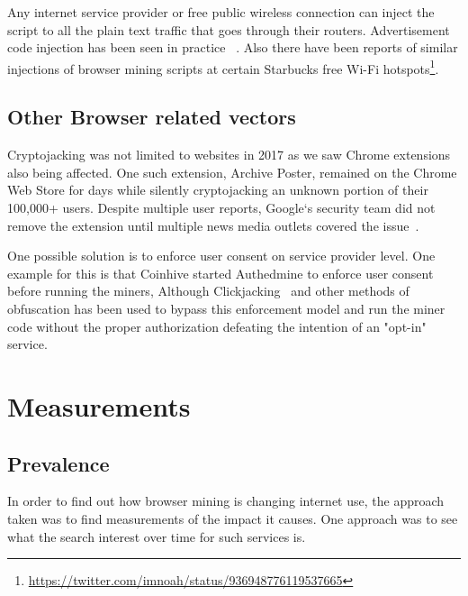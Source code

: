 Any internet service provider or free public wireless connection can inject the script to all the plain text traffic that goes through their routers. Advertisement code injection has been seen in practice ~\cite{vergeadinjection}. Also there have been reports of similar injections of browser mining scripts at certain Starbucks free Wi-Fi hotspots\footnote{\url{https://twitter.com/imnoah/status/936948776119537665}}.


\subsection{Other Browser related vectors} %
Cryptojacking was not limited to websites in 2017 as we saw Chrome extensions also being affected. One such extension, Archive Poster, remained on the Chrome Web Store for days while silently cryptojacking an unknown portion of their 100,000+ users. Despite multiple user reports, Google`s security team did not remove the extension until multiple news media outlets covered the issue~\cite{chromeextentioncoinhive}. 

One possible solution is to enforce user consent on service provider level. One example for this is that Coinhive started Authedmine to enforce user consent before running the miners, Although Clickjacking~\cite{rydstedt2010busting} and other methods of obfuscation has been used to bypass this enforcement model and run the miner code without the proper authorization defeating the intention of an "opt-in" service.





\section{Measurements}

\subsection{Prevalence}

In order to find out how browser mining is changing internet use, the approach taken was to find measurements of the impact it causes. One approach was to see what the search interest over time for such services is. 

